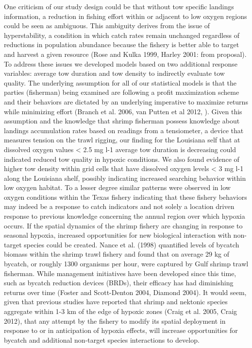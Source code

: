 \documentclass[10pt]{article}
\begin{document}
One criticism of our study design could be that without tow specific landings information, a reduction in fishing effort within or adjacent to low oxygen regions could be seen as ambiguous.  This ambiguity derives from the issue of hyperstability, a condition in which catch rates remain unchanged regardless of reductions in population abundance because the fishery is better able to target and harvest a given resource (Rose and Kulka 1999, Harley 2001: from proposal).  To address these issues we developed models based on two additional response variables: average tow duration and tow density to indirectly evaluate tow quality.  The underlying assumption for all of our statistical models is that the parties (fisherman) being examined are following a profit maximization scheme and their behaviors are dictated by an underlying imperative to maximize returns while minimizing effort (Branch et al. 2006, van Putten et al 2012, ).  Given this assumption and the knowledge that shrimp fisherman possess knowledge about landings accumulation rates based on readings from a tensiometer, a device that measures tension on the trawl rigging, our finding for the Louisiana self that at dissolved oxygen values < 2.5 mg l-1 average tow duration is decreasing could indicated reduced tow quality in hypoxic conditions.  We also found evidence of higher tow density within grid cells that have dissolved oxygen levels < 3 mg l-1 along the Louisiana shelf, possibly indicating increased searching behavior within low oxygen habitat.  To a lesser degree similar patterns were observed in low oxygen conditions within the Texas fishery indicating that these fishery behaviors may indeed be a response to catch indicators and not solely a location driven response to previous knowledge concerning the annual region over which hypoxia occurs.  
	If the spatial dynamics of the shrimp fishery are changing in response to seasonal hypoxia, increased opportunities for new biological interaction with non-target species could be created.  Nance et al. (1998) quantified levels of bycatch biomass within the shrimp trawl fishery and found that on average 29 kg of bycatch, or roughly 1300 organisms per hour, were captured by Gulf shrimp trawl fisherman.  While management initiatives have been developed since this time, such as bycatch reduction devices (BRDs), their efficacy has had diminishing returns over time (Foster and Scott-Denton 2004, Diamond 2004).  It would seem, given that previous studies have reported that shrimp and nektonic species aggregate within 1-3 km of the edge of hypoxic zones (Craig et al. 2005, Craig 2012), that any attempt by the fishery to modify its spatial deployment in response to or in anticipation of hypoxia effects, will increase opportunities for bycatch and additional non-target species interactions to develop.  
\end{document}
